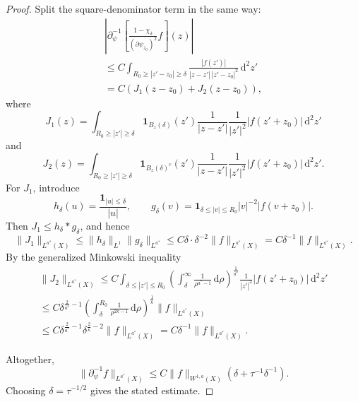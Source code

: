\documentclass[a4paper,11pt]{article}
\newcommand{\pr}{\partial}
\newcommand{\psiz}{\psi_{z_0}}
\newcommand{\dd}{\,\text{d}}
\theoremstyle{plain}
\theoremstyle{definition}
\theoremstyle{remark}
\begin{document}
\begin{proof}
Split the square-denominator term in the same way:
\begin{multline}
\left|\pr_\psi^{-1}\left[\frac{1- \chi_\delta}{(\pr\psiz)^2} f  \right](z)\right| \\
\leq C
\int_{R_0\geq|z'-z_0|\geq\delta}
\frac{|f(z')|}{|z-z'|\,|z'-z_0|^2}\dd^2z'\\[5pt]
=C\left(J_1(z-z_0)+J_2(z-z_0)\right),
\end{multline}
where
\begin{equation}
J_1(z)=\int_{R_0\geq|z'|\geq\delta}\mathbf{1}_{B_z(\delta)}(z')\frac{1}{|z-z'|}\frac{1}{|z'|^2}|f(z'+z_0)|\dd^2z'
\end{equation}
and
\begin{equation}
J_2(z)=\int_{R_0\geq|z'|\geq\delta}\mathbf{1}_{B_z(\delta)^c}(z')\frac{1}{|z-z'|}\frac{1}{|z'|^2}|f(z'+z_0)|\dd^2z'.
\end{equation}
For $J_1$, introduce
\begin{equation}
        h_\delta(u)=\frac{\mathbf 1_{|u|\leq\delta}}{|u|},
        \qquad
        g_\delta(v)=\mathbf 1_{\delta\leq |v|\leq R_0}|v|^{-2}|f(v+z_0)| .
\end{equation}
Then $J_1\leq h_\delta*g_\delta$, and hence
\begin{equation}
        \|J_1\|_{L^{a^*}(X)}
        \leq \|h_\delta\|_{L^1}\|g_\delta\|_{L^{a^*}}
        \leq C\delta\cdot\delta^{-2}\|f\|_{L^{a^*}(X)}
        =C\delta^{-1}\|f\|_{L^{a^*}(X)} .
\end{equation}
By the generalized Minkowski inequality
\begin{multline}
\|J_2\|_{L^{a^*}(X)}\leq C\int_{\delta\leq|z'|\leq R_0}\left(\int_\delta^\infty\frac{1}{\rho^{a^*-1}}\dd\rho\right)^{\frac{1}{a^*}}\frac{1}{|z'|^2}|f(z'+z_0)|\dd^2 z'\\[5pt]
\leq C\delta^{\frac{2}{a^*}-1}\left(\int_\delta^{R_0}\frac{1}{\rho^{2\kappa-1}}\dd\rho\right)^{\frac{1}{\kappa}}\|f\|_{L^{a^*}(X)}\\[5pt]
\leq C\delta^{\frac{2}{a^*}-1}\delta^{\frac{2}{\kappa}-2}\|f\|_{L^{a^*}(X)}
=C\delta^{-1}\|f\|_{L^{a^*}(X)}.
\end{multline}

Altogether,
\begin{equation}
\|\pr_\psi^{-1}f\|_{L^{a^*}(X)}\leq C\|f\|_{W^{1,a}(X)}\left(\delta+\tau^{-1}\delta^{-1} \right).
\end{equation}
Choosing $\delta=\tau^{-1/2}$ gives the stated estimate.
\end{proof}
\end{document}
